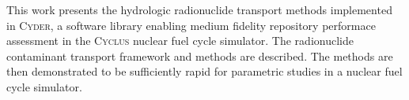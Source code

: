 
This work presents the hydrologic radionuclide transport methods implemented in 
\textsc{Cyder}, a software library enabling medium fidelity repository 
performace assessment in the \textsc{Cyclus} nuclear fuel cycle 
simulator.  The radionuclide contaminant transport framework and methods are 
described. The methods are then demonstrated to be sufficiently rapid for 
parametric studies in a nuclear fuel cycle simulator. 

